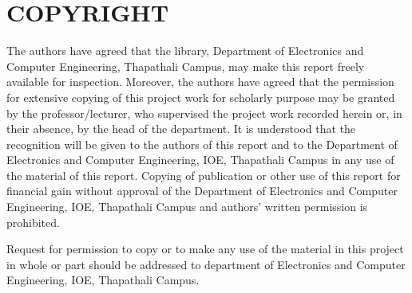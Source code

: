 \chapter*{COPYRIGHT}
{}

The authors have agreed that the library, Department of Electronics and Computer Engineering, Thapathali Campus, may make this report freely available for inspection. Moreover, the authors have agreed that the permission for extensive copying of this project work for scholarly purpose may be granted by the professor/lecturer, who supervised the project work recorded herein or, in their absence, by the head of the department. It is understood that the recognition will be given to the authors of this report and to the Department of Electronics and Computer Engineering, IOE, Thapathali Campus in any use of the material of this report. Copying of publication or other use of this report for financial gain without approval of the Department of Electronics and Computer Engineering, IOE, Thapathali Campus and authors' written permission is prohibited. 

Request for permission to copy or to make any use of the material in this project in whole or part should be addressed to department of Electronics and Computer
Engineering, IOE, Thapathali Campus.
